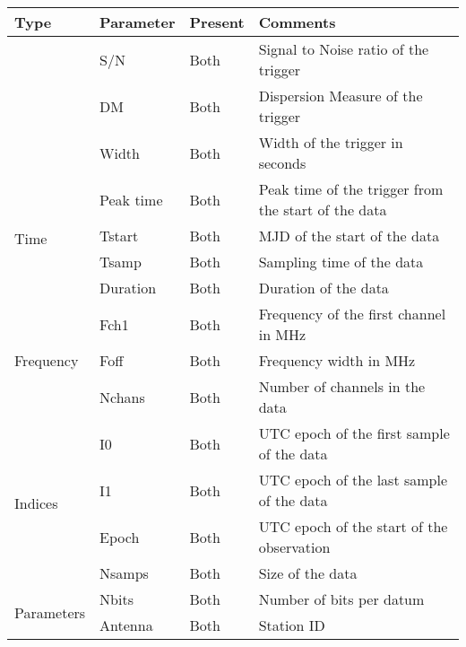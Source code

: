 \begin{table}
	\label{tab:ubson}
	\begin{tabular}{llll}
		\hline
		Type                        & Parameter   & Present & Comments                                               \\ \hline
																& S/N         & Both    & Signal to Noise ratio of the trigger                   \\
																& DM          & Both    & Dispersion Measure of the trigger                      \\
																& Width       & Both    & Width of the trigger in seconds                        \\
		\multirow{4}{*}{Time}       & Peak time   & Both    & Peak time of the trigger from the start of the data    \\
																	& Tstart      & Both    & MJD of the start of the data                           \\
																	& Tsamp       & Both    & Sampling time of the data                              \\
																	& Duration    & Both    & Duration of the data                                   \\
		\multirow{3}{*}{Frequency}  & Fch1        & Both    & Frequency of the first channel in MHz                  \\
																	& Foff        & Both    & Frequency width in MHz                                 \\
																	& Nchans      & Both    & Number of channels in the data                         \\
		\multirow{4}{*}{Indices}    & I0          & Both    & UTC epoch of the first sample of the data              \\
																	& I1          & Both    & UTC epoch of the last sample of the data               \\
																	& Epoch       & Both    & UTC epoch of the start of the observation              \\
																	& Nsamps      & Both    & Size of the data                                       \\
		\multirow{6}{*}{Parameters} & Nbits       & Both    & Number of bits per datum                               \\
																	& Antenna     & Both    & Station ID                                             \\

\end{tabular}
\end{table}
